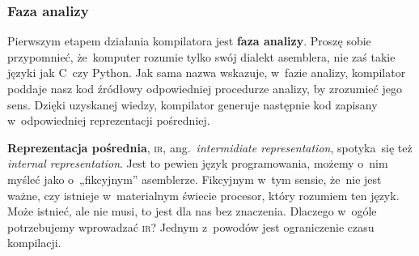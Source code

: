\documentclass[10pt,t]{beamer}
\begin{document}
\begin{frame}
  \frametitle{Faza analizy}


  Pierwszym etapem działania kompilatora jest \textbf{faza analizy}. Proszę
  sobie przypomnieć, że~komputer rozumie tylko swój dialekt asemblera,
  nie zaś takie języki jak C~czy Python. Jak sama nazwa wskazuje, w~fazie
  analizy, kompilator poddaje nasz kod źródłowy odpowiedniej procedurze
  analizy, by zrozumieć jego sens. Dzięki uzyskanej wiedzy, kompilator
  generuje następnie kod zapisany w~odpowiedniej reprezentacji pośredniej.

  \textbf{Reprezentacja pośrednia}, \textsc{ir},
  ang.~\textit{intermidiate representation}, spotyka~się też
  \textit{internal representation}. Jest to pewien język programowania,
  możemy o~nim myśleć jako o~„fikcyjnym” asemblerze. Fikcyjnym w~tym sensie,
  że~nie jest ważne, czy istnieje w~materialnym świecie procesor, który
  rozumiem ten język. Może istnieć, ale nie musi, to jest dla nas bez
  znaczenia. Dlaczego w~ogóle potrzebujemy wprowadzać \textsc{ir}?
  Jednym z~powodów jest ograniczenie czasu kompilacji.

\end{frame}
\end{document}
